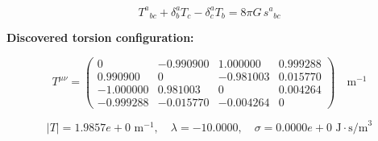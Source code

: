
\begin{equation}
  T^a{}_{bc} + \delta^a_b T_c - \delta^a_c T_b = 8\pi G \, s^a{}_{bc}
\end{equation}

\textbf{Discovered torsion configuration:}

\begin{equation}
  T^{\mu\nu} = \begin{pmatrix}
    0 & -0.990900 & 1.000000 & 0.999288 \\
    0.990900 & 0 & -0.981003 & 0.015770 \\
    -1.000000 & 0.981003 & 0 & 0.004264 \\
    -0.999288 & -0.015770 & -0.004264 & 0
  \end{pmatrix} \quad \text{m}^{-1}
\end{equation}

\begin{equation}
  |T| = 1.9857e+0 \text{ m}^{-1}, \quad
  \lambda = -10.0000, \quad
  \sigma = 0.0000e+0 \text{ J}\cdot\text{s/m}^3
\end{equation}
